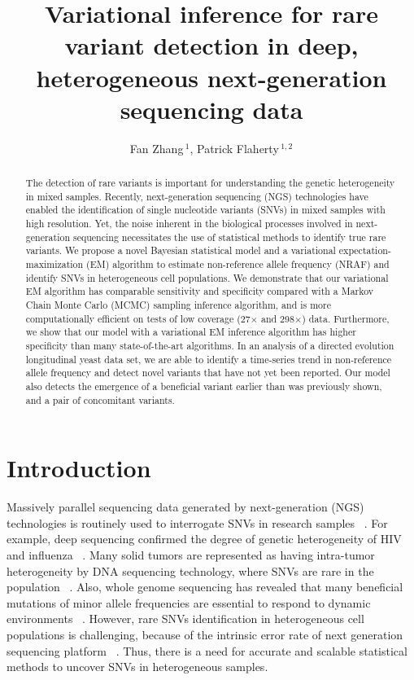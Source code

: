 \documentclass[11pt,reqno]{amsart}
\title[VI for RVD]{Variational inference for rare variant detection in deep, heterogeneous next-generation sequencing data}
\author[F. Zhang AND P. Flaherty]{Fan Zhang\,$^{1}$, Patrick Flaherty\,$^{1,2}$}
\begin{document}
\maketitle

\begin{abstract}
  The detection of rare variants is important for understanding the genetic heterogeneity in mixed samples.
Recently, next-generation sequencing (NGS) technologies have enabled the identification of single nucleotide variants (SNVs) in mixed samples with high resolution.
Yet, the noise inherent in the biological processes involved in next-generation sequencing necessitates the use of statistical methods to identify true rare variants.
We propose a novel Bayesian statistical model and a variational expectation-maximization (EM) algorithm to estimate non-reference allele frequency (NRAF) and identify SNVs in heterogeneous cell populations.
We demonstrate that our variational EM algorithm has comparable sensitivity and specificity compared with a Markov Chain Monte Carlo (MCMC) sampling inference algorithm, and is more computationally efficient on tests of low coverage (27$\times$ and 298$\times$) data.
Furthermore, we show that our model with a variational EM inference algorithm has higher specificity than many state-of-the-art algorithms.
In an analysis of a directed evolution longitudinal yeast data set, we are able to identify a time-series trend in non-reference allele frequency and detect novel variants that have not yet been reported.
Our model also detects the emergence of a beneficial variant earlier than was previously shown, and a pair of concomitant variants.
\end{abstract}

\section{Introduction}
Massively parallel sequencing data generated by next-generation (NGS) technologies is routinely used to interrogate SNVs in research samples ~\citep{koboldt2013next}.
For example, deep sequencing confirmed the degree of genetic heterogeneity of HIV \citet{} and influenza ~\citep{flaherty2011ultrasensitive}.
Many solid tumors are represented as having intra-tumor heterogeneity by DNA sequencing technology, where SNVs are rare in the population ~\citep{navin2010inferring}.
Also, whole genome sequencing has revealed that many beneficial mutations of minor allele frequencies are essential to respond to dynamic environments ~\citep{kvitek2013whole}.
However, rare SNVs identification in heterogeneous cell populations is challenging, because of the intrinsic error rate of next generation sequencing platform ~\citep{shendure2008next}.
Thus, there is a need for accurate and scalable statistical methods to uncover SNVs in heterogeneous samples.
\end{document}
